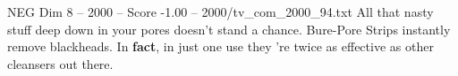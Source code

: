 \begin{textsample}{NEG Dim 8 – 2000 – Score -1.00 – 2000/tv\_com\_2000\_94.txt}  \label{ex:f8_neg_062}
All that nasty stuff deep down in your pores doesn't stand a chance.
Bure-Pore Strips instantly remove blackheads.
In \textbf{fact}, in just one use they 're twice as effective as other cleansers out there.

\end{textsample}
